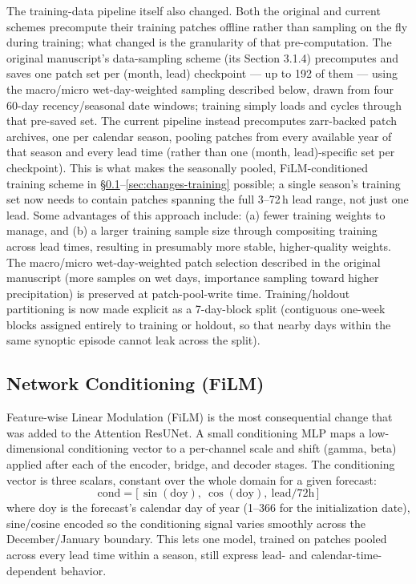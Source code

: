 \documentclass[11pt]{article}
\begin{document}
The training-data pipeline itself also changed. Both the original and
current schemes precompute their training patches offline rather than
sampling on the fly during training; what changed is the granularity
of that pre-computation. The original manuscript's data-sampling scheme
(its Section 3.1.4) precomputes and saves one patch set per (month,
lead) checkpoint --- up to 192 of them --- using the macro/micro
wet-day-weighted sampling described below, drawn from four 60-day
recency/seasonal date windows; training simply loads and cycles
through that pre-saved set. The current pipeline instead precomputes
zarr-backed patch archives, one per calendar season, pooling patches
from every
available year of that season and every lead time (rather than one
(month, lead)-specific set per checkpoint). This is what makes the 
seasonally pooled, FiLM-conditioned training scheme in
\S\ref{sec:changes-conditioning}--\ref{sec:changes-training} possible;
a single season's training set now needs to contain patches spanning
the full 3--72\,h lead range, not just one lead.  Some advantages of this
approach include: (a) fewer training weights to manage, and (b) a larger training
sample size through compositing training across lead times, resulting
in presumably more stable, higher-quality weights.  The macro/micro
wet-day-weighted patch selection described in the original manuscript
(more samples on wet days, importance sampling toward higher
precipitation) is preserved at patch-pool-write time. Training/holdout
partitioning is now made explicit as a 7-day-block split (contiguous
one-week blocks assigned entirely to training or holdout, so that nearby
days within the same synoptic episode cannot leak across the split).

\subsection{Network Conditioning (FiLM)}
\label{sec:changes-conditioning}

Feature-wise Linear Modulation (FiLM) is the most consequential 
change that was added to the Attention ResUNet.
A small conditioning MLP maps a low-dimensional conditioning vector to
a per-channel scale and shift (gamma, beta) applied after each of the
encoder, bridge, and decoder stages. The conditioning vector is three
scalars, constant over the whole domain for a given forecast:
\[
  \text{cond} = \big[\,\sin(\text{doy}),\ \cos(\text{doy}),\
  \text{lead}/72\text{h}\,\big]
\]
where $\text{doy}$ is the forecast's calendar day of year (1--366 for
the initialization date), sine/cosine encoded so the conditioning
signal varies smoothly across the December/January boundary.
This lets one model, trained on patches pooled across every lead time
within a season, still express lead- and calendar-time-dependent
behavior.
\end{document}

